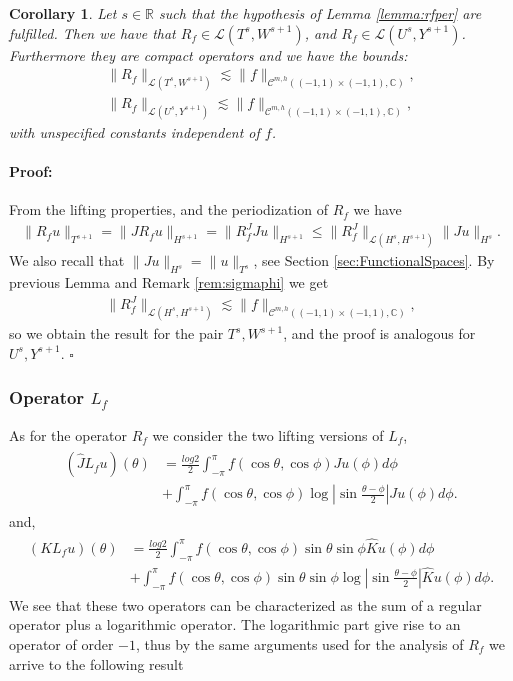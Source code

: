 \documentclass{article}
\newtheorem{corollary}[theorem]{Corollary}
\newenvironment{proof}{\paragraph{Proof:}}{\hfill$\square$}
\newcommand{\IC}{{\mathbb C}}
\newcommand{\IR}{{\mathbb R}}
\newcommand{\cmspaceh}[4]{\mathcal{C}^{#1,#2} \left( #3, #4 \right)}
\newcommand{\iinterv}{(-1,1)\times(-1,1)}
\begin{document}
\begin{corollary}
\label{corollary:rfop}
Let $s  \in \IR$ such that the hypothesis of Lemma \ref{lemma:rfper} are fulfilled. Then we have that 
$R_f  \in \mathcal{L}(T^{s},W^{s+1})$, and $R_f \in \mathcal{L}(U^{s},Y^{s+1})$. Furthermore they are compact operators and we have the bounds:
\begin{align*}
\| R_f\|_{ \mathcal{L}(T^{s},W^{s+1})} \lesssim \|f\|_{\cmspaceh{m}{h}{\iinterv}{\IC}},\\
\| R_f\|_{ \mathcal{L}(U^{s},Y^{s+1})} \lesssim \|f\|_{\cmspaceh{m}{h}{\iinterv}{\IC}},
\end{align*}
with unspecified constants independent of $f$.
\end{corollary}
\begin{proof}
From the lifting properties, and the periodization of $R_f$ we have 
\begin{align*}
\| R_f u\|_{T^{s+1}} = \|  J R_f u \|_{H^{s+1}} = \|R_f^J Ju \|_{H^{s+1}} \leq \| R_f^J\|_{\mathcal{L}(H^{s},H^{s+1})} \|J u \|_{H^{s}}. 
\end{align*}
We also recall that $\|J u \|_{H^{s}} = \|u\|_{T^{s}}$, see Section \ref{sec:FunctionalSpaces}. By previous Lemma and Remark \ref{rem:sigmaphi} we get 
\begin{align*}
\| R_f^J\|_{\mathcal{L}(H^{s},H^{s+1})} \lesssim \|f\|_{\cmspaceh{m}{h}{\iinterv}{\IC}},
\end{align*}
so we obtain the result for the pair $T^{s}, W^{s+1}$, and the proof is analogous for $U^{s},Y^{s+1}$.
\end{proof}
\subsubsection{Operator $L_f$}

As for the operator $R_f$ we consider the two lifting versions of $L_f$, 
\begin{align}
\label{eq:Lsplit}
\begin{split}
(\widehat{J}L_fu)(\theta) &= \frac{log{2}}{2} \int_{-\pi}^{\pi} f(\cos \theta , \cos \phi) Ju(\phi) d\phi \\&+ \int_{-\pi}^{\pi} f(\cos \theta, \cos \phi) \log \left\vert \sin \frac{\theta-\phi}{2} \right\vert Ju(\phi) d\phi.
\end{split}
\end{align}
and, 
\begin{align}
\label{eq:Lsplitodd}
\begin{split}
(KL_fu)(\theta) &= \frac{log{2}}{2} \int_{-\pi}^{\pi} f(\cos \theta , \cos \phi)\sin \theta \sin \phi \widehat{K}u(\phi) d\phi \\&+ \int_{-\pi}^{\pi} f(\cos \theta, \cos \phi)\sin \theta \sin \phi \log \left\vert \sin \frac{\theta-\phi}{2} \right\vert \widehat{K}u(\phi) d\phi.
\end{split}
\end{align}
We see that these two operators can be characterized as the sum of a regular operator plus a logarithmic operator. The logarithmic part give rise to an operator of order $-1$, thus by the same arguments used for the analysis of $R_f$ we arrive to the following result  
\end{document}
